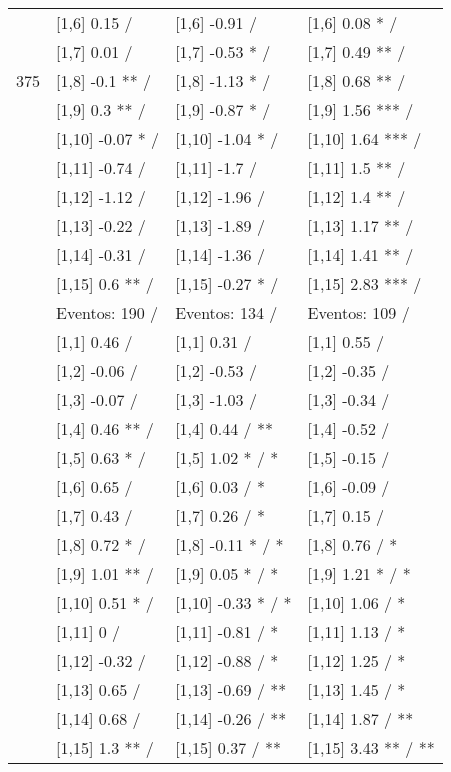 \begin{table}
\begin{tabular}[t]{llll}
 & {}[1,6] 0.15  / & {}[1,6] -0.91  / & {}[1,6] 0.08 * /\\
 & {}[1,7] 0.01  / & {}[1,7] -0.53 * / & {}[1,7] 0.49 ** /\\
375 & {}[1,8] -0.1 ** / & {}[1,8] -1.13 * / & {}[1,8] 0.68 ** /\\
\addlinespace
 & {}[1,9] 0.3 ** / & {}[1,9] -0.87 * / & {}[1,9] 1.56 *** /\\
 & {}[1,10] -0.07 * / & {}[1,10] -1.04 * / & {}[1,10] 1.64 *** /\\
 & {}[1,11] -0.74  / & {}[1,11] -1.7  / & {}[1,11] 1.5 ** /\\
 & {}[1,12] -1.12  / & {}[1,12] -1.96  / & {}[1,12] 1.4 ** /\\
 & {}[1,13] -0.22  / & {}[1,13] -1.89  / & {}[1,13] 1.17 ** /\\
\addlinespace
 & {}[1,14] -0.31  / & {}[1,14] -1.36  / & {}[1,14] 1.41 ** /\\
 & {}[1,15] 0.6 ** / & {}[1,15] -0.27 * / & {}[1,15] 2.83 *** /\\
 & Eventos:  190 / & Eventos:  134 / & Eventos:  109 /\\
 & {}[1,1] 0.46  / & {}[1,1] 0.31  / & {}[1,1] 0.55  /\\
 & {}[1,2] -0.06  / & {}[1,2] -0.53  / & {}[1,2] -0.35  /\\
\addlinespace
 & {}[1,3] -0.07  / & {}[1,3] -1.03  / & {}[1,3] -0.34  /\\
 & {}[1,4] 0.46 ** / & {}[1,4] 0.44  / ** & {}[1,4] -0.52  /\\
 & {}[1,5] 0.63 * / & {}[1,5] 1.02 * / * & {}[1,5] -0.15  /\\
 & {}[1,6] 0.65  / & {}[1,6] 0.03  / * & {}[1,6] -0.09  /\\
 & {}[1,7] 0.43  / & {}[1,7] 0.26  / * & {}[1,7] 0.15  /\\
\addlinespace
500 & {}[1,8] 0.72 * / & {}[1,8] -0.11 * / * & {}[1,8] 0.76  / *\\
 & {}[1,9] 1.01 ** / & {}[1,9] 0.05 * / * & {}[1,9] 1.21 * / *\\
 & {}[1,10] 0.51 * / & {}[1,10] -0.33 * / * & {}[1,10] 1.06  / *\\
 & {}[1,11] 0  / & {}[1,11] -0.81  / * & {}[1,11] 1.13  / *\\
 & {}[1,12] -0.32  / & {}[1,12] -0.88  / * & {}[1,12] 1.25  / *\\
\addlinespace
 & {}[1,13] 0.65  / & {}[1,13] -0.69  / ** & {}[1,13] 1.45  / *\\
 & {}[1,14] 0.68  / & {}[1,14] -0.26  / ** & {}[1,14] 1.87  / **\\
 & {}[1,15] 1.3 ** / & {}[1,15] 0.37  / ** & {}[1,15] 3.43 ** / **\\
\bottomrule
\end{tabular}
\end{table}
